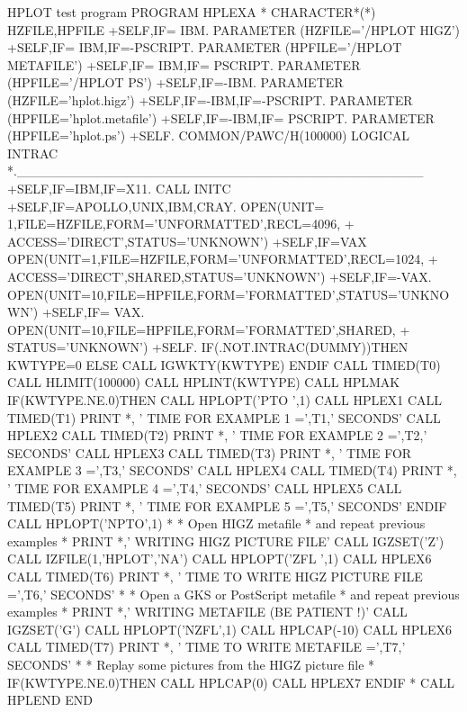 \begin{XMPt}{HPLOT test program}
      PROGRAM HPLEXA
*
      CHARACTER*(*) HZFILE,HPFILE
+SELF,IF= IBM.
      PARAMETER (HZFILE='/HPLOT HIGZ')
+SELF,IF= IBM,IF=-PSCRIPT.
      PARAMETER (HPFILE='/HPLOT METAFILE')
+SELF,IF= IBM,IF= PSCRIPT.
      PARAMETER (HPFILE='/HPLOT PS')
+SELF,IF=-IBM.
      PARAMETER (HZFILE='hplot.higz')
+SELF,IF=-IBM,IF=-PSCRIPT.
      PARAMETER (HPFILE='hplot.metafile')
+SELF,IF=-IBM,IF= PSCRIPT.
      PARAMETER (HPFILE='hplot.ps')
+SELF.
      COMMON/PAWC/H(100000)
      LOGICAL INTRAC
*.___________________________________________
+SELF,IF=IBM,IF=X11.
      CALL INITC
+SELF,IF=APOLLO,UNIX,IBM,CRAY.
      OPEN(UNIT= 1,FILE=HZFILE,FORM='UNFORMATTED',RECL=4096,
     +     ACCESS='DIRECT',STATUS='UNKNOWN')
+SELF,IF=VAX
      OPEN(UNIT=1,FILE=HZFILE,FORM='UNFORMATTED',RECL=1024,
     +     ACCESS='DIRECT',SHARED,STATUS='UNKNOWN')
+SELF,IF=-VAX.
      OPEN(UNIT=10,FILE=HPFILE,FORM='FORMATTED',STATUS='UNKNOWN')
+SELF,IF= VAX.
      OPEN(UNIT=10,FILE=HPFILE,FORM='FORMATTED',SHARED,
     +     STATUS='UNKNOWN')
+SELF.
      IF(.NOT.INTRAC(DUMMY))THEN
         KWTYPE=0
      ELSE
         CALL IGWKTY(KWTYPE)
      ENDIF
      CALL TIMED(T0)
      CALL HLIMIT(100000)
      CALL HPLINT(KWTYPE)
      CALL HPLMAK
      IF(KWTYPE.NE.0)THEN
         CALL HPLOPT('PTO ',1)
         CALL HPLEX1
         CALL TIMED(T1)
         PRINT *, ' TIME FOR EXAMPLE 1 =',T1,'  SECONDS'
         CALL HPLEX2
         CALL TIMED(T2)
         PRINT *, ' TIME FOR EXAMPLE 2 =',T2,'  SECONDS'
         CALL HPLEX3
         CALL TIMED(T3)
         PRINT *, ' TIME FOR EXAMPLE 3 =',T3,'  SECONDS'
         CALL HPLEX4
         CALL TIMED(T4)
         PRINT *, ' TIME FOR EXAMPLE 4 =',T4,'  SECONDS'
         CALL HPLEX5
         CALL TIMED(T5)
         PRINT *, ' TIME FOR EXAMPLE 5 =',T5,'  SECONDS'
      ENDIF
      CALL HPLOPT('NPTO',1)
*
*          Open HIGZ metafile
*          and repeat previous examples
*
      PRINT *,' WRITING HIGZ PICTURE FILE'
      CALL IGZSET('Z')
      CALL IZFILE(1,'HPLOT','NA')
      CALL HPLOPT('ZFL ',1)
      CALL HPLEX6
      CALL TIMED(T6)
      PRINT *, ' TIME TO WRITE HIGZ PICTURE FILE =',T6,'  SECONDS'
*
*          Open a GKS or PostScript metafile
*          and repeat previous examples
*
      PRINT *,' WRITING METAFILE (BE PATIENT !)'
      CALL IGZSET('G')
      CALL HPLOPT('NZFL',1)
      CALL HPLCAP(-10)
      CALL HPLEX6
      CALL TIMED(T7)
      PRINT *, ' TIME TO WRITE METAFILE =',T7,'  SECONDS'
*
*          Replay some pictures from the HIGZ picture file
*
      IF(KWTYPE.NE.0)THEN
         CALL HPLCAP(0)
         CALL HPLEX7
      ENDIF
*
      CALL HPLEND
      END
\end{XMPt}


